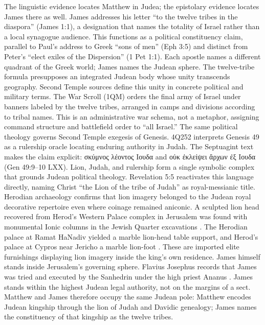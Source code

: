 The linguistic evidence locates Matthew in Judea; the epistolary evidence locates James there as well.
James addresses his letter ``to the twelve tribes in the diaspora'' (James 1:1), a designation that names the totality of Israel rather than a local synagogue audience.
This functions as a political constituency claim, parallel to Paul's address to Greek ``sons of men'' (Eph 3:5) and distinct from Peter's ``elect exiles of the Dispersion'' (1 Pet 1:1).
Each apostle names a different quadrant of the Greek world; James names the Judean sphere.
The twelve-tribe formula presupposes an integrated Judean body whose unity transcends geography.
Second Temple sources define this unity in concrete political and military terms.
The War Scroll (1QM) orders the final army of Israel under banners labeled by the twelve tribes, arranged in camps and divisions according to tribal names.
This is an administrative war schema, not a metaphor, assigning command structure and battlefield order to ``all Israel.''
The same political theology governs Second Temple exegesis of Genesis.
4Q252 interprets Genesis 49 as a rulership oracle locating enduring authority in Judah.
The Septuagint text makes the claim explicit: σκύμνος λέοντος Ιουδα and οὐκ ἐκλείψει ἄρχων ἐξ Ιουδα (Gen 49:9--10 LXX).
Lion, Judah, and rulership form a single symbolic complex that grounds Judean political theology.
Revelation 5:5 reactivates this language directly, naming Christ ``the Lion of the tribe of Judah'' as royal-messianic title.
Herodian archaeology confirms that lion imagery belonged to the Judean royal decorative repertoire even where coinage remained aniconic.
A sculpted lion head recovered from Herod's Western Palace complex in Jerusalem was found with monumental Ionic columns in the Jewish Quarter excavations \cite{pelegbarkat:herodian}.
The Herodian palace at Ramat HaNadiv yielded a marble lion-head table support, and Herod's palace at Cypros near Jericho a marble lion-foot \cite{hirschfeld:ramathanadiv}.
These are imported elite furnishings displaying lion imagery inside the king's own residence.
James himself stands inside Jerusalem's governing sphere.
Flavius Josephus records that James was tried and executed by the Sanhedrin under the high priest Ananus \cite[20.200--203]{josephus:ant}.
James stands within the highest Judean legal authority, not on the margins of a sect.
Matthew and James therefore occupy the same Judean pole: Matthew encodes Judean kingship through the lion of Judah and Davidic genealogy; James names the constituency of that kingship as the twelve tribes.

